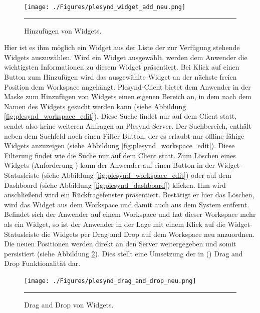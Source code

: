 \begin{figure}
  \centering
  \texttt{[image: ./Figures/plesynd\_widget\_add\_neu.png]}
    \rule{35em}{0.5pt}
  \caption[Plesynd User"=Interface: Hinzufügen von Widgets]{Hinzufügen von Widgets.}
  \label{fig:plesynd_widget_add}
\end{figure}
Hier ist es ihm möglich ein Widget aus der Liste der zur Verfügung stehende Widgets auszuwählen. Wird ein Widget ausgewählt, werden dem Anwender die wichtigsten Informationen zu diesem Widget präsentiert. Bei Klick auf einen Button zum Hinzufügen wird das ausgewählte Widget an der nächste freien Position dem Workspace angehängt. Plesynd-Client bietet dem Anwender in der Maske zum Hinzufügen von Widgets einen eigenen Bereich an, in dem nach dem Namen des Widgets gesucht werden kann (siehe Abbildung \ref{fig:plesynd_workspace_edit}). Diese Suche findet nur auf dem Client statt, sendet also keine weiteren Anfragen an Plesynd-Server. Der Suchbereich, enthält neben dem Suchfeld noch einen Filter-Button, der es erlaubt nur offline-fähige Widgets anzuzeigen (siehe Abbildung \ref{fig:plesynd_workspace_edit}). Diese Filterung findet wie die Suche nur auf dem Client statt. Zum Löschen eines Widgets (Anforderung  \emph{\requirementWidgetDelete}) kann der Anwender auf einen Button in der Widget-Statusleiste (siehe Abbildung \ref{fig:plesynd_workspace_edit}) oder auf dem Dashboard (siehe Abbildung \ref{fig:plesynd_dashboard}) klicken. Ihm wird anschließend wird ein Rückfragefenster präsentiert. Bestätigt er hier das Löschen, wird das Widget aus dem Workspace und damit auch aus dem System entfernt. Befindet sich der Anwender auf einem Workspace und hat dieser Workspace mehr als ein Widget, so ist der Anwender in der Lage mit einem Klick auf die Widget-Statusleiste die Widgets per Drag and Drop auf dem Workspace neu anzuordnen. Die neuen Positionen werden direkt an den Server weitergegeben und somit persistiert (siehe Abbildung \ref{fig:plesynd_drag_and_drop}). Dies stellt eine Umsetzung der in  (\emph{\requirementWidgetSortDragNDrop}) Drag and Drop Funktionalität dar. 
\begin{figure}
  \centering
  \texttt{[image: ./Figures/plesynd\_drag\_and\_drop\_neu.png]}
    \rule{35em}{0.5pt}
  \caption[Plesynd User"=Interface: Drag and Drop von Widgets]{Drag and Drop von Widgets.}
  \label{fig:plesynd_drag_and_drop}
\end{figure}
